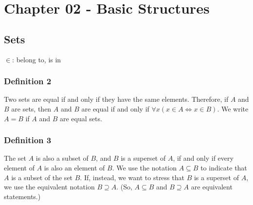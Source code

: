 \documentclass{article}
\begin{document}
\newcommand{\hr}{\par\noindent\rule{\textwidth}{0.4pt}}

\newcommand{\bc}[1]{
	\begin{equation*}
		\begin{boxed}
			{#1}
		\end{boxed}
	\end{equation*}
}

\newcommand{\cond}[2]{
	\ifmmode
	{#1} \quad {#2}
	\else
	$$ {#1} \quad {#2} $$
	\fi
}

\newcommand{\matr}[1]{
	\ifmmode \bm{#1}
	\else \textit{\textbf{#1}}
	\fi
}
\newcommand{\vect}[1]{
	\ifmmode \mathbf{#1}
	\else \textbf{#1}
	\fi
}


\tableofcontents

\section{Chapter 02 - Basic Structures}

\subsection{Sets}

\textbf{$ \in $}: belong to, is in

\subsubsection{Definition 2}

Two sets are equal if and only if they have the same elements. Therefore, if $ A $ and $ B $ are sets, then $ A $ and $ B $ are equal if and only if $ \forall x \left( x \in A \iff x \in B \right) $. We write $ A = B $ if $ A $ and $ B $ are equal sets.

\subsubsection{Definition 3}

The set $ A $ is also a subset of $ B $, and $ B $ is a superset of $ A $, if and only if every element of $ A $ is also an element of $ B $. We use the notation $ A \subseteq B $ to indicate that $ A $ is a subset of the set $ B $. If, instead, we want to stress that $ B $ is a superset of $ A $, we use the equivalent notation $ B \supseteq A $. (So, $ A \subseteq B $ and $ B \supseteq A $ are equivalent statements.)
\end{document}
